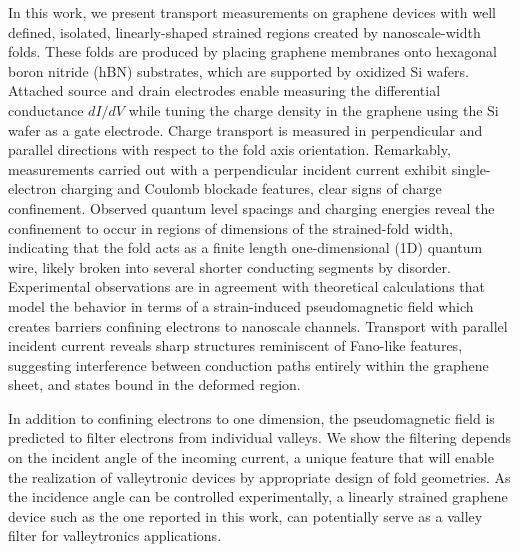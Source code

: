 \documentclass[journal=jacsat,manuscript=article]{achemso}
\begin{document}
In this work, we present transport measurements on graphene devices with well defined, isolated, linearly-shaped strained regions created by nanoscale-width folds. These folds are produced by placing graphene membranes onto hexagonal boron nitride (hBN) substrates\cite{dean2010boron}, which are supported by oxidized Si wafers. Attached source and drain electrodes enable measuring the differential conductance $dI/dV$ while tuning the charge density in the graphene using the Si wafer as a gate electrode. Charge transport is measured in perpendicular and parallel directions with  respect to the fold axis orientation. Remarkably, measurements carried out with a perpendicular incident current exhibit single-electron charging and Coulomb blockade features, clear signs of charge confinement. Observed quantum level spacings and charging energies reveal the confinement to occur in regions of dimensions of the strained-fold width, indicating that the fold acts as a finite length one-dimensional (1D) quantum wire, likely broken into several shorter conducting segments by disorder. Experimental observations are in agreement with theoretical calculations that model the behavior in terms of a strain-induced pseudomagnetic field \cite{pereira2009strain,Carrillo-Bastos2016} which creates barriers confining electrons to nanoscale channels. Transport with parallel incident current reveals sharp structures reminiscent of Fano-like features\cite{Goeres2000}, suggesting interference between conduction paths entirely within the graphene sheet, and states bound in the deformed region. 

In addition to confining electrons to one dimension, the pseudomagnetic field is predicted to filter electrons from individual valleys\cite{Carrillo-Bastos2016}. We show the filtering depends on the incident angle of the incoming current, a unique feature that will enable the realization of valleytronic devices\cite{garcia2008fully,Akhmerov2008,Rycerz2007,Carrillo-Bastos2016} by appropriate design of fold geometries. As the incidence angle can be controlled experimentally, a linearly strained graphene device such as the one reported in this work, can potentially serve as a valley filter for valleytronics applications.



\end{document}
